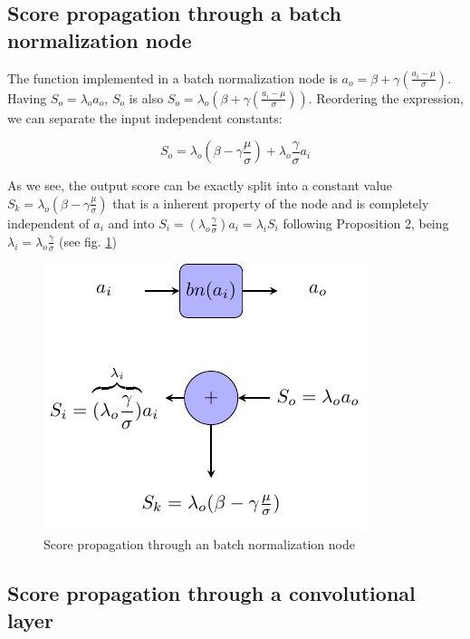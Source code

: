 \subsection{Score propagation through a batch normalization node} 

The function implemented in a batch normalization node is $a_o = \beta + \gamma (\frac{a_i - \mu}{\sigma})$. Having $S_o = \lambda_o a_o$, $S_o$ is also $S_o = \lambda_o ( \beta + \gamma (\frac{a_i - \mu}{\sigma}))$. Reordering the expression, we can separate the input independent constants: 

\begin{equation}
S_o = \lambda_o (\beta - \gamma \frac{\mu}{\sigma}) + \lambda_o \frac{\gamma}{\sigma}a_i
\end{equation}

As we see, the output score can be exactly split into a constant value $S_k = \lambda_o (\beta - \gamma \frac{\mu}{\sigma})$ that is a inherent property of the node and is completely independent of $a_i$ and into $S_i = (\lambda_o \frac{\gamma}{\sigma})a_i = \lambda_i S_i$ following Proposition 2, being $\lambda_i = \lambda_o \frac{\gamma}{\sigma}$ (see fig. \ref{score:fig:score_bn})

\begin{figure}[!ht]
	\centering
	\includegraphics{Figures/chapter_interpretation/figures/score_bn.pdf}
	\caption{Score propagation through an batch normalization node}
	\label{score:fig:score_bn}
\end{figure}

\subsection{Score propagation through a convolutional layer}

